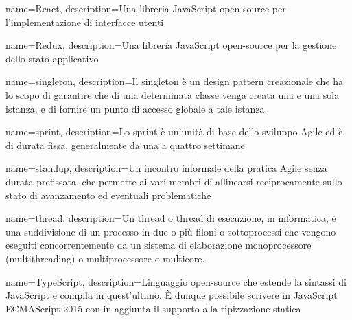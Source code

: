 {
    name=React,
    description={Una libreria JavaScript open-source per l'implementazione di interfacce utenti}
}

{
    name=Redux,
    description={Una libreria JavaScript open-source per la gestione dello stato applicativo}
}

{
    name=singleton,
    description={Il singleton è un design pattern creazionale che ha lo scopo di garantire che di una determinata classe venga creata una e una sola istanza, e di fornire un punto di accesso globale a tale istanza. }
}

{
    name=sprint,
    description={Lo sprint è un'unità di base dello sviluppo Agile ed è di durata fissa, generalmente da una a quattro settimane}
}

{
    name=standup,
    description={Un incontro informale della pratica Agile senza durata prefissata, che permette ai vari membri di allinearsi reciprocamente sullo stato di avanzamento ed eventuali problematiche}
}

{
    name=thread,
    description={Un thread o thread di esecuzione, in informatica, è una suddivisione di un processo in due o più filoni o sottoprocessi che vengono eseguiti concorrentemente da un sistema di elaborazione monoprocessore (multithreading) o multiprocessore o multicore. }
}

{
    name=TypeScript,
    description={Linguaggio open-source che estende la sintassi di JavaScript e compila in quest'ultimo. È dunque possibile scrivere in JavaScript ECMAScript 2015 con in aggiunta il supporto alla tipizzazione statica}
}

